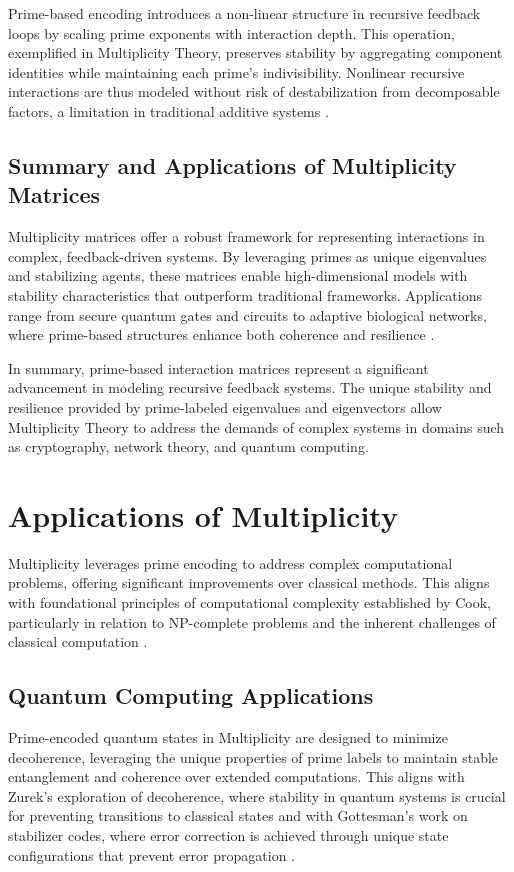 \documentclass{article}
\begin{document}
Prime-based encoding introduces a non-linear structure in recursive feedback loops by scaling prime exponents with interaction depth. This operation, exemplified in Multiplicity Theory, preserves stability by aggregating component identities while maintaining each prime's indivisibility. Nonlinear recursive interactions are thus modeled without risk of destabilization from decomposable factors, a limitation in traditional additive systems \citep{blizard1989}.

\subsection{Summary and Applications of Multiplicity Matrices}

Multiplicity matrices offer a robust framework for representing interactions in complex, feedback-driven systems. By leveraging primes as unique eigenvalues and stabilizing agents, these matrices enable high-dimensional models with stability characteristics that outperform traditional frameworks. Applications range from secure quantum gates and circuits to adaptive biological networks, where prime-based structures enhance both coherence and resilience \citep{freeman2004, aaronson2005}.

In summary, prime-based interaction matrices represent a significant advancement in modeling recursive feedback systems. The unique stability and resilience provided by prime-labeled eigenvalues and eigenvectors allow Multiplicity Theory to address the demands of complex systems in domains such as cryptography, network theory, and quantum computing.


\section{Applications of Multiplicity}
Multiplicity leverages prime encoding to address complex computational problems, offering significant improvements over classical methods. This aligns with foundational principles of computational complexity established by Cook, particularly in relation to NP-complete problems and the inherent challenges of classical computation \cite{cook1971}.

\subsection{Quantum Computing Applications}

Prime-encoded quantum states in Multiplicity are designed to minimize decoherence, leveraging the unique properties of prime labels to maintain stable entanglement and coherence over extended computations. This aligns with Zurek’s exploration of decoherence, where stability in quantum systems is crucial for preventing transitions to classical states \cite{zurek1993} and with Gottesman’s work on stabilizer codes, where error correction is achieved through unique state configurations that prevent error propagation \cite{gottesman1997}.
\end{document}
